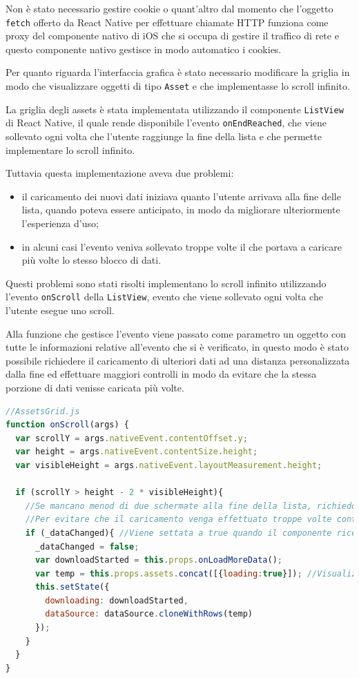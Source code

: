 Non è stato necessario gestire cookie o quant'altro dal momento che l'oggetto \texttt{fetch} offerto da React Native per effettuare chiamate HTTP funziona come proxy del componente nativo di iOS che si occupa di gestire il traffico di rete e questo componente nativo gestisce in modo automatico i cookies.

Per quanto riguarda l'interfaccia grafica è stato necessario modificare la griglia in modo che visualizzare oggetti di tipo \texttt{Asset} e che implementasse lo scroll infinito.

La griglia degli assets è stata implementata utilizzando il componente \texttt{ListView} di React Native, il quale rende disponibile l'evento \texttt{onEndReached}, che viene sollevato ogni volta che l'utente raggiunge la fine della lista e che permette implementare lo scroll infinito. 

Tuttavia questa implementazione aveva due problemi:
\begin{itemize}
\item il caricamento dei nuovi dati iniziava quanto l'utente arrivava alla fine delle lista, quando poteva essere anticipato, in modo da migliorare ulteriormente l'esperienza d'uso;
\item in alcuni casi l'evento veniva sollevato troppe volte il che portava a caricare più volte lo stesso blocco di dati.
\end{itemize}

Questi problemi sono stati risolti implementano lo scroll infinito utilizzando l'evento \texttt{onScroll} della \texttt{ListView}, evento che viene sollevato ogni volta che l'utente esegue uno scroll.

Alla funzione che gestisce l'evento viene passato come parametro un oggetto con tutte le informazioni relative all'evento che si è verificato, in questo modo è stato possibile richiedere il caricamento di ulteriori dati ad una distanza personalizzata dalla fine ed effettuare maggiori controlli in modo da evitare che la stessa porzione di dati venisse caricata più volte.

\begin{lstlisting}[language=JavaScript, caption=Funzione che gestisce l'evento onScroll della griglia che visualizza gli assets]
//AssetsGrid.js
function onScroll(args) {
  var scrollY = args.nativeEvent.contentOffset.y;
  var height = args.nativeEvent.contentSize.height;
  var visibleHeight = args.nativeEvent.layoutMeasurement.height;

  if (scrollY > height - 2 * visibleHeight){
    //Se mancano menod di due schermate alla fine della lista, richiedo il caricamento di ulteriori dati
    //Per evitare che il caricamento venga effettuato troppe volte controllo che i dati siano cambiati rispetto all'ultima volta che ho effettuato il caricamento.
    if (_dataChanged){ //Viene settata a true quando il componente riceve dei dati nuovi
      _dataChanged = false;
      var downloadStarted = this.props.onLoadMoreData();
      var temp = this.props.assets.concat([{loading:true}]); //Visualizza un'indicatore di caricamento
      this.setState({
        downloading: downloadStarted,
        dataSource: dataSource.cloneWithRows(temp)
      });
    }
  }
}
\end{lstlisting}

